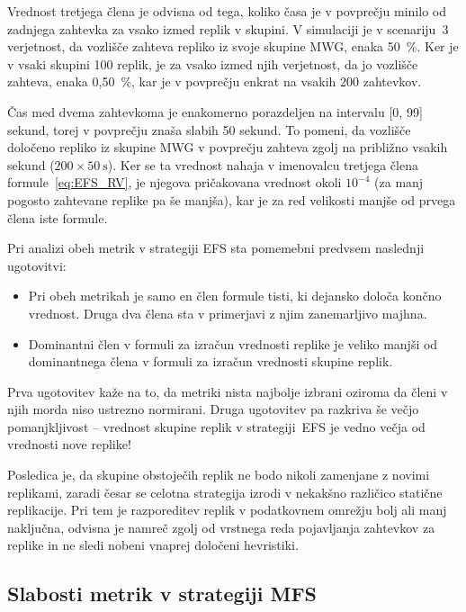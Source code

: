 \documentclass[a4paper, 12pt]{book}
\begin{document}
Vrednost tretjega člena je odvisna od tega, koliko časa je v povprečju minilo
od zadnjega zahtevka za vsako izmed replik v skupini. V simulaciji je v
scenariju~3 verjetnost, da vozlišče zahteva repliko iz svoje
skupine MWG, enaka 50~\%. Ker je v vsaki skupini 100 replik, je za vsako
izmed njih verjetnost, da jo vozlišče zahteva, enaka 0,50~\%, kar je v
povprečju enkrat na vsakih 200 zahtevkov.

Čas med dvema zahtevkoma je enakomerno porazdeljen na intervalu [0, 99] sekund,
torej v povprečju znaša slabih 50 sekund. To pomeni, da vozlišče določeno
repliko iz skupine MWG v povprečju zahteva zgolj na približno vsakih
 sekund ($200 \times 50\:\text{s}$).
Ker se ta vrednost nahaja v imenovalcu tretjega člena
formule~\eqref{eq:EFS_RV}, je njegova pričakovana vrednost okoli $10^{-4}$ (za
manj pogosto zahtevane replike pa še manjša), kar je za red velikosti manjše
od prvega člena iste formule.

Pri analizi obeh metrik v strategiji EFS sta pomemebni predvsem naslednji
ugotovitvi:
\begin{itemize}
\item Pri obeh metrikah je samo en člen formule tisti, ki dejansko določa
končno vrednost. Druga dva člena sta v primerjavi z njim zanemarljivo majhna.

\item Dominantni člen v formuli za izračun vrednosti replike je veliko manjši
od dominantnega člena v formuli za izračun vrednosti skupine replik.
\end{itemize}

Prva ugotovitev kaže na to, da metriki nista najbolje izbrani oziroma da
členi v njih morda niso ustrezno normirani. Druga ugotovitev pa razkriva še
večjo pomanjkljivost -- vrednost skupine replik v strategiji~EFS je vedno
večja od vrednosti nove replike!

Posledica je, da skupine obstoječih replik ne bodo nikoli zamenjane z novimi
replikami, zaradi česar se celotna strategija izrodi v nekakšno različico
statične replikacije. Pri tem je razporeditev replik v podatkovnem
omrežju bolj ali manj naključna, odvisna je namreč zgolj od
vrstnega reda pojavljanja zahtevkov za replike in ne sledi nobeni vnaprej
določeni hevristiki.


\subsection{Slabosti metrik v strategiji MFS}
\end{document}
